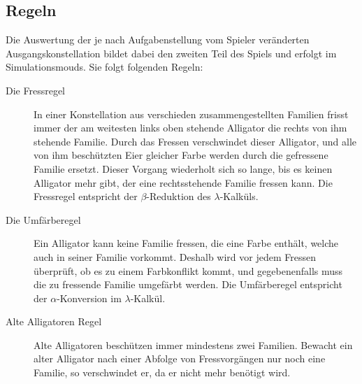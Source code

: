 \subsection{Regeln}
	Die Auswertung der je nach Aufgabenstellung vom Spieler veränderten Ausgangskonstellation bildet dabei den zweiten Teil des Spiels und erfolgt im 			    	Simulationsmouds. 
	Sie folgt folgenden Regeln:

	\begin{description}
		            \item[Die Fressregel] In einer Konstellation aus verschieden zusammengestellten Familien frisst immer der am weitesten links oben stehende 						Alligator die rechts von ihm stehende Familie.
		            Durch das Fressen verschwindet dieser Alligator, und alle von ihm beschützten Eier gleicher Farbe werden durch die gefressene Familie ersetzt.
		            Dieser Vorgang wiederholt sich so lange, bis es keinen Alligator mehr gibt, der eine rechtsstehende Familie fressen kann.
		            Die Fressregel entspricht der \(\beta\)-Reduktion des \(\lambda\)-Kalküls.

		            \item[Die Umfärberegel] Ein Alligator kann keine Familie fressen, die eine Farbe enthält, welche auch in seiner Familie vorkommt.
		            Deshalb wird vor jedem Fressen überprüft, ob es zu einem Farbkonflikt kommt, und gegebenenfalls muss die zu fressende Familie umgefärbt werden.
		            Die Umfärberegel entspricht der \(\alpha\)-Konversion im \(\lambda\)-Kalkül.

		            \item[Alte Alligatoren Regel] Alte Alligatoren beschützen immer mindestens zwei Familien.
		            Bewacht ein alter Alligator nach einer Abfolge von Fressvorgängen nur noch eine Familie, so verschwindet er, da er nicht mehr benötigt wird.

	\end{description}


